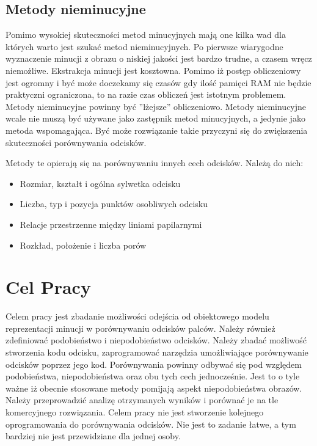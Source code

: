 \subsection[Metody nieminucyjne][Metody nieminucyjne]{Metody nieminucyjne}

Pomimo wysokiej skuteczności metod minucyjnych mają one kilka wad dla których warto jest szukać metod nieminucyjnych.
Po pierwsze wiarygodne wyznaczenie minucji z obrazu o niskiej jakości jest bardzo trudne, a czasem wręcz niemożliwe. Ekstrakcja minucji jest kosztowna. Pomimo iż postęp obliczeniowy jest ogromny i być może doczekamy się czasów gdy ilość pamięci RAM nie będzie praktyczni ograniczona, to na razie czas obliczeń jest istotnym problemem. Metody nieminucyjne powinny być ''lżejsze'' obliczeniowo. Metody nieminucyjne wcale nie muszą być używane jako zastępnik metod minucyjnych, a jedynie jako metoda wspomagająca. Być może rozwiązanie takie przyczyni się do zwiększenia skuteczności porównywania odcisków. 

Metody te opierają się na porównywaniu innych cech odcisków. Należą do nich:
\renewcommand*{\labelitemi}{\bullet}
\begin{itemize}
	\item Rozmiar, kształt i ogólna sylwetka odcisku
	\item Liczba, typ i pozycja punktów osobliwych odcisku
	\item Relacje przestrzenne między liniami papilarnymi
	\item Rozkład, położenie i liczba porów
\end{itemize}
\vspace{.5cm}\par

\section[Cel Pracy][Cel Pracy]{Cel Pracy}

Celem pracy jest zbadanie możliwości odejścia od obiektowego modelu reprezentacji minucji w porównywaniu odcisków palców. Należy również zdefiniować podobieństwo i niepodobieństwo odcisków.
Należy zbadać możliwość stworzenia kodu odcisku, zaprogramować narzędzia umożliwiające porównywanie odcisków poprzez jego kod. Porównywania powinny odbywać się pod względem podobieństwa, niepodobieństwa oraz obu tych cech jednocześnie. Jest to o tyle ważne iż obecnie stosowane metody pomijają aspekt niepodobieństwa obrazów. Należy przeprowadzić analizę otrzymanych wyników
i porównać je na tle komercyjnego rozwiązania. Celem pracy nie jest stworzenie kolejnego oprogramowania do porównywania odcisków. Nie jest to zadanie łatwe, a tym bardziej nie jest przewidziane dla jednej osoby.

